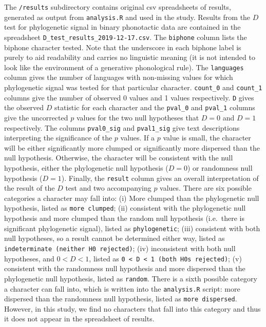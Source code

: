 The \texttt{/results} subdirectory contains original csv spreadsheets of
results, generated as output from \texttt{analysis.R} and used in the
study. Results from the \(D\) test for phylogenetic signal in binary
phonotactic data are contained in the spreadsheet
\texttt{D\_test\_results\_2019-12-17.csv}. The \texttt{biphone} column
lists the biphone character tested. Note that the underscore in each
biphone label is purely to aid readability and carries no linguistic
meaning (it is not intended to look like the environment of a generative
phonological rule). The \texttt{languages} column gives the number of
languages with non-missing values for which phylogenetic signal was
tested for that particular character. \texttt{count\_0} and
\texttt{count\_1} columns give the number of observed 0 values and 1
values respectively. \texttt{D} gives the observed \(D\) statistic for
each character and the \texttt{pval\_0} and \texttt{pval\_1} columns
give the uncorrected \(p\) values for the two null hypotheses that
\(D = 0\) and \(D = 1\) respectively. The columns \texttt{pval0\_sig}
and \texttt{pval1\_sig} give text descriptions interpreting the
significance of the \(p\) values. If a \(p\) value is small, the
character will be either significantly more clumped or significantly
more dispersed than the null hypothesis. Otherwise, the character will
be consistent with the null hypothesis, either the phylogenetic null
hypothesis (\(D = 0\)) or randomness null hypothesis (\(D = 1\)).
Finally, the \texttt{result} column gives an overall interpretation of
the result of the \(D\) test and two accompanying \(p\) values. There
are six possible categories a character may fall into: (i) More clumped
than the phylogenetic null hypothesis, listed as \texttt{more\ clumped};
(ii) consistent with the phylogenetic null hypothesis and more clumped
than the random null hypothesis (i.e.~there is significant phylogenetic
signal), listed as \texttt{phylogenetic}; (iii) consistent with both
null hypotheses, so a result cannot be determined either way, listed as
\texttt{indeterminate\ (neither\ H0\ rejected)}; (iv) inconsistent with
both null hypotheses, and \(0 < D < 1\), listed as
\texttt{0\ \textless{}\ D\ \textless{}\ 1\ (both\ H0s\ rejected)}; (v)
consistent with the randomness null hypothesis and more dispersed than
the phylogenetic null hypothesis, listed as \texttt{random}. There is a
sixth possible category a character can fall into, which is written into
the \texttt{analysis.R} script: more dispersed than the randomness null
hypothesis, listed as \texttt{more\ dispersed}. However, in this study,
we find no characters that fall into this category and thus it does not
appear in the spreadsheet of results.

